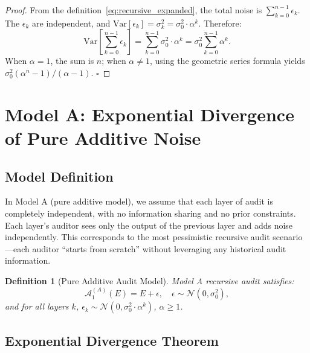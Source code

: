 \documentclass[12pt,a4paper]{article}
\newtheorem{definition}[theorem]{Definition}
\theoremstyle{definition}
\newcommand{\Var}{\mathrm{Var}}
\newcommand{\AuditOp}{\mathcal{A}}
\begin{document}
\begin{proof}
From the definition~\eqref{eq:recursive_expanded}, the total noise is $\sum_{k=0}^{n-1} \epsilon_k$. The $\epsilon_k$ are independent, and $\Var[\epsilon_k] = \sigma_k^2 = \sigma_0^2 \cdot \alpha^k$. Therefore:
\begin{equation*}
    \Var\left[\sum_{k=0}^{n-1} \epsilon_k\right] = \sum_{k=0}^{n-1} \sigma_0^2 \cdot \alpha^k = \sigma_0^2 \sum_{k=0}^{n-1} \alpha^k.
\end{equation*}
When $\alpha=1$, the sum is $n$; when $\alpha \neq 1$, using the geometric series formula yields $\sigma_0^2 (\alpha^n - 1)/(\alpha - 1)$. \hfill$\square$
\end{proof}

\section{Model A: Exponential Divergence of Pure Additive Noise}

\subsection{Model Definition}

\noindent
In Model A (pure additive model), we assume that each layer of audit is completely independent, with no information sharing and no prior constraints. Each layer's auditor sees only the output of the previous layer and adds noise independently. This corresponds to the most pessimistic recursive audit scenario---each auditor ``starts from scratch'' without leveraging any historical audit information.

\begin{definition}[Pure Additive Audit Model]\label{def:model_a}
Model A recursive audit satisfies:
\begin{equation}\label{eq:model_a}
    \AuditOp_1^{(A)}(E) = E + \epsilon, \quad \epsilon \sim \mathcal{N}(0, \sigma_0^2),
\end{equation}
and for all layers $k$, $\epsilon_k \sim \mathcal{N}(0, \sigma_0^2 \cdot \alpha^k)$, $\alpha \geq 1$.
\end{definition}

\subsection{Exponential Divergence Theorem}
\end{document}
